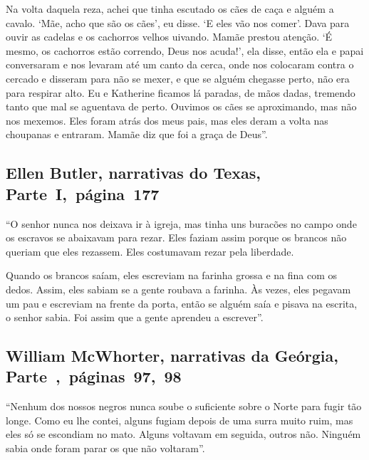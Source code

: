 Na volta daquela reza, achei que tinha escutado os cães de caça e alguém
a cavalo. `Mãe, acho que são os cães', eu disse. `E eles vão nos comer'.
Dava para ouvir as cadelas e os cachorros velhos uivando. Mamãe prestou
atenção. `É mesmo, os cachorros estão correndo, Deus nos acuda!', ela
disse, então ela e papai conversaram e nos levaram até um canto da
cerca, onde nos colocaram contra o cercado e disseram para não se mexer,
e que se alguém chegasse perto, não era para respirar alto. Eu e
Katherine ficamos lá paradas, de mãos dadas, tremendo tanto que mal se
aguentava de perto. Ouvimos os cães se aproximando, mas não nos mexemos.
Eles foram atrás dos meus pais, mas eles deram a volta nas choupanas e
entraram. Mamãe diz que foi a graça de Deus''.

\subsection{Ellen Butler, narrativas do Texas, Parte~I,~página~177} \label{ref41}

``O senhor nunca nos deixava ir à igreja, mas tinha uns buracões no
campo onde os escravos se abaixavam para rezar. Eles faziam assim porque
os brancos não queriam que eles rezassem. Eles costumavam rezar pela
liberdade.

Quando os brancos saíam, eles escreviam na farinha grossa e na fina com
os dedos. Assim, eles sabiam se a gente roubava a farinha. Às vezes,
eles pegavam um pau e escreviam na frente da porta, então se alguém saía
e pisava na escrita, o senhor sabia. Foi assim que a gente aprendeu a
escrever''.

\subsection{William McWhorter, narrativas da Geórgia, Parte~,~páginas~97,~98}
\label{ref192}

``Nenhum dos nossos negros nunca soube o suficiente sobre o Norte para
fugir tão longe. Como eu lhe contei, alguns fugiam depois de uma surra
muito ruim, mas eles só se escondiam no mato. Alguns voltavam em
seguida, outros não. Ninguém sabia onde foram parar os que não
voltaram''.



